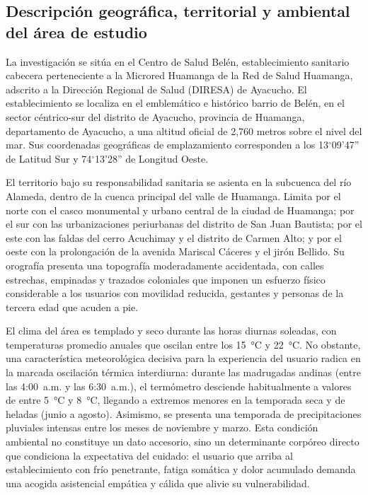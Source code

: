 \subsection{Descripción geográfica, territorial y ambiental del área de estudio}
\label{sec:2.1_geografia}

La investigación se sitúa en el Centro de Salud Belén, establecimiento sanitario cabecera perteneciente a la Microred Huamanga de la Red de Salud Huamanga, adscrito a la Dirección Regional de Salud (DIRESA) de Ayacucho. El establecimiento se localiza en el emblemático e histórico barrio de Belén, en el sector céntrico-sur del distrito de Ayacucho, provincia de Huamanga, departamento de Ayacucho, a una altitud oficial de 2,760 metros sobre el nivel del mar. Sus coordenadas geográficas de emplazamiento corresponden a los 13$^\circ$09'47'' de Latitud Sur y 74$^\circ$13'28'' de Longitud Oeste.

El territorio bajo su responsabilidad sanitaria se asienta en la subcuenca del río Alameda, dentro de la cuenca principal del valle de Huamanga. Limita por el norte con el casco monumental y urbano central de la ciudad de Huamanga; por el sur con las urbanizaciones periurbanas del distrito de San Juan Bautista; por el este con las faldas del cerro Acuchimay y el distrito de Carmen Alto; y por el oeste con la prolongación de la avenida Mariscal Cáceres y el jirón Bellido. Su orografía presenta una topografía moderadamente accidentada, con calles estrechas, empinadas y trazados coloniales que imponen un esfuerzo físico considerable a los usuarios con movilidad reducida, gestantes y personas de la tercera edad que acuden a pie.

El clima del área es templado y seco durante las horas diurnas soleadas, con temperaturas promedio anuales que oscilan entre los 15~°C y 22~°C. No obstante, una característica meteorológica decisiva para la experiencia del usuario radica en la marcada oscilación térmica interdiurna: durante las madrugadas andinas (entre las 4:00~a.m. y las 6:30~a.m.), el termómetro desciende habitualmente a valores de entre 5~°C y 8~°C, llegando a extremos menores en la temporada seca y de heladas (junio a agosto). Asimismo, se presenta una temporada de precipitaciones pluviales intensas entre los meses de noviembre y marzo. Esta condición ambiental no constituye un dato accesorio, sino un determinante corpóreo directo que condiciona la expectativa del cuidado: el usuario que arriba al establecimiento con frío penetrante, fatiga somática y dolor acumulado demanda una acogida asistencial empática y cálida que alivie su vulnerabilidad.

